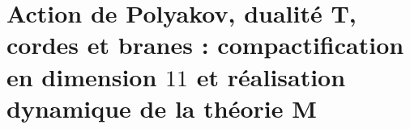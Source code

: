 \chapter{Action de Polyakov, dualité T, cordes et branes : compactification en dimension \texorpdfstring{\(11\)}{11} et réalisation dynamique de la théorie M}
\label{chap:md-teoria-m-definitiva}
\begingroup
\let\HMTOwnerSection\section
\let\HMTOwnerSubsection\subsection
\let\HMTOwnerSubsubsection\subsubsection
\let\HMTOwnerParagraph\paragraph
\let\chapter\HMTOwnerSection
\let\section\HMTOwnerSubsection
\let\subsection\HMTOwnerSubsubsection
\let\subsubsection\HMTOwnerParagraph

\endgroup
\begingroup
\let\HMTOwnerSection\section
\let\HMTOwnerSubsection\subsection
\let\HMTOwnerSubsubsection\subsubsection
